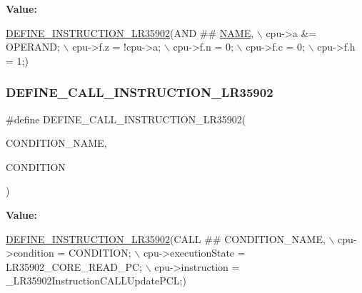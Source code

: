 {\bfseries Value\+:}
\begin{DoxyCode}
\mbox{\hyperlink{isa-lr35902_8c_a3128fc43c5d01e8b51f67901c0b4b5ef}{DEFINE\_INSTRUCTION\_LR35902}}(AND ## \mbox{\hyperlink{inflate_8h_a164ea0159d5f0b5f12a646f25f99eceaa67bc2ced260a8e43805d2480a785d312}{NAME}}, \(\backslash\)
        cpu->a &= OPERAND; \(\backslash\)
        cpu->f.z = !cpu->a; \(\backslash\)
        cpu->f.n = 0; \(\backslash\)
        cpu->f.c = 0; \(\backslash\)
        cpu->f.h = 1;)
\end{DoxyCode}
\mbox{\label{isa-lr35902_8c_a1aec8b657e19acd0c93a5327bfbc0326}} 
\subsubsection{\texorpdfstring{D\+E\+F\+I\+N\+E\+\_\+\+C\+A\+L\+L\+\_\+\+I\+N\+S\+T\+R\+U\+C\+T\+I\+O\+N\+\_\+\+L\+R35902}{DEFINE\_CALL\_INSTRUCTION\_LR35902}}
{\footnotesize\ttfamily \#define D\+E\+F\+I\+N\+E\+\_\+\+C\+A\+L\+L\+\_\+\+I\+N\+S\+T\+R\+U\+C\+T\+I\+O\+N\+\_\+\+L\+R35902(\begin{DoxyParamCaption}\item[{}]{C\+O\+N\+D\+I\+T\+I\+O\+N\+\_\+\+N\+A\+ME,  }\item[{}]{C\+O\+N\+D\+I\+T\+I\+ON }\end{DoxyParamCaption})}

{\bfseries Value\+:}
\begin{DoxyCode}
\mbox{\hyperlink{isa-lr35902_8c_a3128fc43c5d01e8b51f67901c0b4b5ef}{DEFINE\_INSTRUCTION\_LR35902}}(CALL ## CONDITION\_NAME, \(\backslash\)
        cpu->condition = CONDITION; \(\backslash\)
        cpu->executionState = LR35902\_CORE\_READ\_PC; \(\backslash\)
        cpu->instruction = \_LR35902InstructionCALLUpdatePCL;)
\end{DoxyCode}
\mbox{\label{isa-lr35902_8c_a9f057efe45467caaaec1c9642e860178}} 

